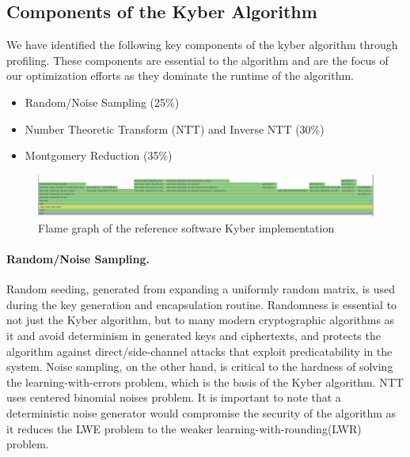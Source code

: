 
\subsection*{Components of the Kyber Algorithm}

We have identified the following key components of the kyber algorithm through profiling. 
These components are essential to the algorithm and are the focus of our optimization efforts as 
they dominate the runtime of the algorithm.
\begin{itemize}
    \item Random/Noise Sampling (25\%)
    \item Number Theoretic Transform (NTT) and Inverse NTT (30\%)
    \item Montgomery Reduction (35\%)
\end{itemize}

\begin{figure}
    \centering
    \includegraphics[width=\linewidth]{imgs/flame-graph.png}
    \caption{Flame graph of the reference software Kyber implementation}
    \label{fig:intro-timeline}
\end{figure}

\paragraph{Random/Noise Sampling.}
Random seeding, generated from expanding a uniformly random matrix, is used during the key generation and encapsulation 
routine. Randomness is essential to not just the Kyber algorithm, but to many modern cryptographic algorithms as it
and avoid determinism in generated keys and ciphertexts, and protects the algorithm against direct/side-channel attacks 
that exploit predicatability in the system. Noise sampling, on the other hand, is critical to the hardness of solving 
the learning-with-errors problem, which is the basis of the Kyber algorithm. NTT uses centered binomial noises problem.
It is important to note that a deterministic noise generator would compromise the security of the algorithm as it reduces
the LWE problem to the weaker learning-with-rounding(LWR) problem.


